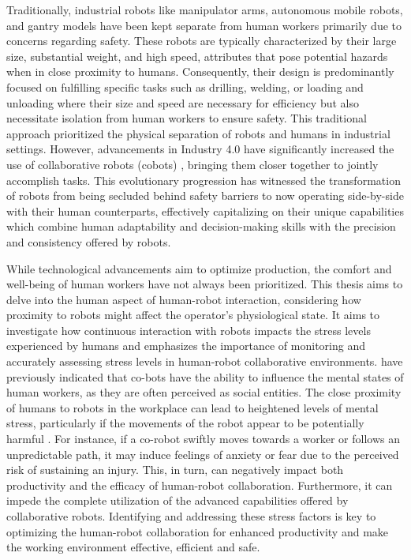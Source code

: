 Traditionally, industrial robots like manipulator arms, autonomous mobile robots, and gantry models have been kept separate from human workers primarily due to concerns regarding safety. These robots are typically characterized by their large size, substantial weight, and high speed, attributes that pose potential hazards when in close proximity to humans. Consequently, their design is predominantly focused on fulfilling specific tasks such as drilling, welding, or loading and unloading where their size and speed are necessary for efficiency but also necessitate isolation from human workers to ensure safety. This traditional approach prioritized the physical separation of robots and humans in industrial settings. However, advancements in Industry 4.0 have significantly increased the use of collaborative robots (cobots) , bringing them closer together to jointly accomplish tasks. This evolutionary progression has witnessed the transformation of robots from being secluded behind safety barriers to now operating side-by-side with their human counterparts, effectively capitalizing on their unique capabilities which combine human adaptability and decision-making skills with the precision and consistency offered by robots. 


While technological advancements aim to optimize production, the comfort and well-being of human workers have not always been prioritized. This thesis aims to delve into the human aspect of human-robot interaction, considering how proximity to robots might affect the operator's physiological state. It aims to investigate how continuous interaction with robots impacts the stress levels experienced by humans and emphasizes the importance of monitoring and accurately assessing stress levels in human-robot collaborative environments. \textcite{Saupp} have previously indicated that co-bots have the ability to influence the mental states of human workers, as they are often perceived as social entities. The close proximity of humans to robots in the workplace can lead to heightened levels of mental stress, particularly if the movements of the robot appear to be potentially harmful \parencite{Lasota}. For instance, if a co-robot swiftly moves towards a worker or follows an unpredictable path, it may induce feelings of anxiety or fear due to the perceived risk of sustaining an injury. This, in turn, can negatively impact both productivity and the efficacy of human-robot collaboration. Furthermore, it can impede the complete utilization of the advanced capabilities offered by collaborative robots. Identifying and addressing these stress factors is key to optimizing the human-robot collaboration for enhanced productivity and make the working environment effective, efficient and safe. 


